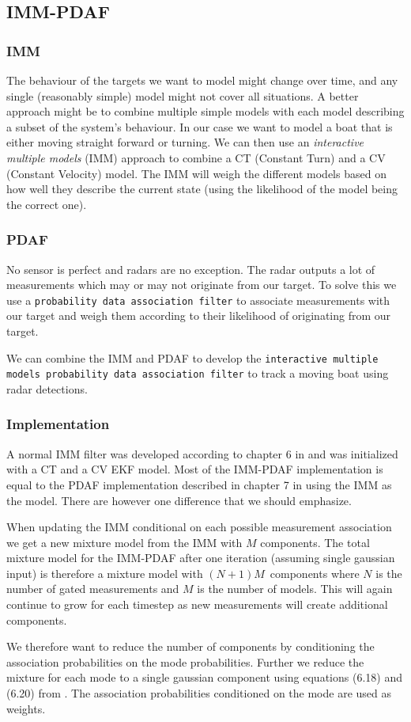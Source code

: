 \subsection{IMM-PDAF}
\subsubsection{IMM}
The behaviour of the targets we want to model might change over time, and any single (reasonably simple) model might not cover all situations. A better approach might be to combine multiple simple models with each model describing a subset of the system's behaviour. In our case we want to model a boat that is either moving straight forward or turning. We can then use an \textit{interactive multiple models} (IMM) approach to combine a CT (Constant Turn) and a CV (Constant Velocity) model. The IMM will weigh the different models based on how well they describe the current state (using the likelihood of the model being the correct one).

\subsubsection{PDAF}
No sensor is perfect and radars are no exception. The radar outputs a lot of measurements which may or may not originate from our target. To solve this we use a \texttt{probability data association filter} to associate measurements with our target and weigh them according to their likelihood of originating from our target.

We can combine the IMM and PDAF to develop the \texttt{interactive multiple models probability data association filter} to track a moving boat using radar detections.

\subsubsection{Implementation}
A normal IMM filter was developed according to chapter 6 in \cite{edmund} and was initialized with a CT and a CV EKF model. Most of the IMM-PDAF implementation is equal to the PDAF implementation described in chapter 7 in \cite{edmund} using the IMM as the model. There are however one difference that we should emphasize.

When updating the IMM conditional on each possible measurement association we get a new mixture model from the IMM with $M$ components. The total mixture model for the IMM-PDAF after one iteration (assuming single gaussian input) is therefore a mixture model with $(N+1)M$ components where $N$ is the number of gated measurements and $M$ is the number of models. This will again continue to grow for each timestep as new measurements will create additional components.

We therefore want to reduce the number of components by conditioning the association probabilities on the mode probabilities. Further we reduce the mixture for each mode to a single gaussian component using equations (6.18) and (6.20) from \cite{edmund}. The association probabilities conditioned on the mode are used as weights.



